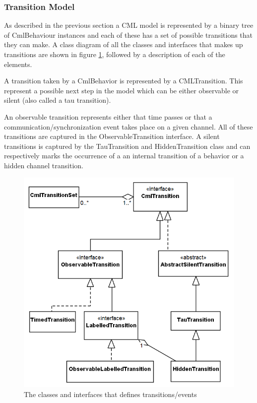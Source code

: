 \documentclass[a4paper, 10pt]{include/compassreport}   %
\begin{document}
\subsubsection{Transition Model}
\label{sec:transition_model}

As described in the previous section a CML model is represented by a
binary tree of CmlBehaviour instances and each of these has a set of
possible transitions that they can make. A class diagram of all the
classes and interfaces that makes up transitions are shown in figure
\ref{fig:events}, followed by a description of each of the elements.

A transition taken by a CmlBehavior is represented by a
CMLTransition. This represent a possible next step in the model which can be either observable or silent (also called a tau
transition). 

An observable transition represents either that time passes or that a
communication/synchronization event takes place on a given
channel. All of these transitions are captured in the
ObservableTransition interface.  A silent transitions is captured by
the TauTransition and HiddenTransition class and can respectively
marks the occurrence of a an internal transition of a behavior or a
hidden channel transition.

\begin{figure}[ht!]
  \begin{center}
    \includegraphics[width=1\textwidth]{figures/Events}
    \caption{The classes and interfaces that defines transitions/events}
    \label{fig:events}
  \end{center}
\end{figure}
\end{document}
